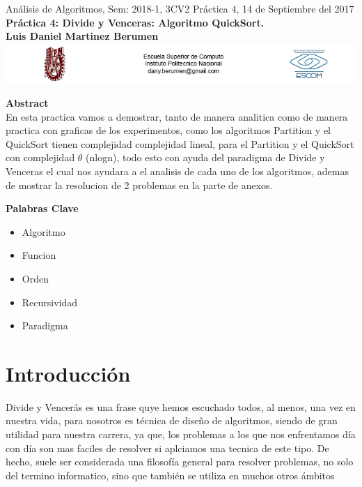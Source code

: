 \documentclass[spanish]{article}
\begin{document}
	\setmarginsrb{30mm}{30mm}{30mm}{30mm}{0pt}{0mm}{0pt}{0mm}
	\begin{center}
	{\Large Análisis de Algoritmos, Sem: 2018-1, 3CV2 Práctica 4, 14 de Septiembre del 2017}\\
	{\huge {\bf Práctica 4: Divide y Venceras: Algoritmo QuickSort.}} \\
	{\large {\bf Luis Daniel Martinez Berumen}}\\
	\includegraphics[width=1\textwidth]{./imagenes/logos.png}\\

\end{center}

	\bigskip
	
	\bigskip
	
	\bigskip
	
	{\LARGE {\bf Abstract}}\\
En esta practica vamos a demostrar, tanto de manera analitica como de manera practica con graficas de los experimentos, como los algoritmos Partition y el QuickSort tienen complejidad complejidad lineal, para el Partition y el QuickSort con complejidad  $\theta$ (nlogn), todo esto con ayuda del paradigma de Divide y Venceras el cual nos ayudara a el analisis de cada uno de los algoritmos, ademas de mostrar la resolucion de 2 problemas en la parte de anexos.
\bigskip

	{\Large {\bf Palabras Clave}}\\
	\begin{itemize}
		\item Algoritmo
		\item Funcion
		\item Orden
		\item Recursividad
		\item Paradigma
	\end{itemize}
	
	\section{Introducci\'on}
	Divide y Vencerás es una frase quye hemos escuchado todos, al menos, una vez en nuestra vida, para nosotros 
	es técnica de diseño de algoritmos, siendo de gran utilidad para nuestra carrera, ya que, 
	los problemas a los que nos enfrentamos día con día son mas faciles de resolver si aplciamos una tecnica de este tipo.
	De hecho, suele ser considerada una filosofía general para resolver problemas, no solo del termino informatico, sino que también se utiliza en muchos otros ámbitos
\end{document}
